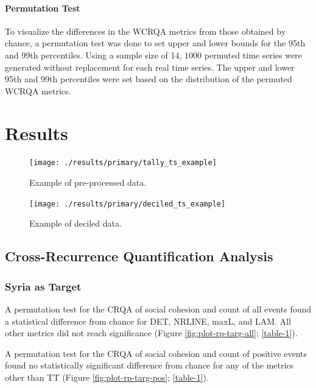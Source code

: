 \documentclass[
  english,
  man]{apa6}
\let\oldparagraph\paragraph
\renewcommand{\paragraph}[1]{\oldparagraph{#1}\mbox{}}
\begin{document}
\hypertarget{permutation-test-1}{%
\paragraph{Permutation Test}\label{permutation-test-1}}

To visualize the differences in the WCRQA metrics from those obtained by chance,
a permutation test was done to set upper and lower bounds for the 95th and 99th
percentiles. Using a sample size of 14, \(1000\) permuted time series were
generated without replacement for each real time series. The upper and lower
95th and 99th percentiles were set based on the distribution of the permuted
WCRQA metrics.

\hypertarget{results}{%
\section{Results}\label{results}}

\begin{figure}
\texttt{[image: ./results/primary/tally\_ts\_example]} \caption{Example of pre-processed data.}\label{fig:raw-ts}
\end{figure}

\begin{figure}
\texttt{[image: ./results/primary/deciled\_ts\_example]} \caption{Example of deciled data.}\label{fig:deciled-ts}
\end{figure}

\hypertarget{cross-recurrence-quantification-analysis-1}{%
\subsection{Cross-Recurrence Quantification Analysis}\label{cross-recurrence-quantification-analysis-1}}

\hypertarget{syria-as-target}{%
\subsubsection{Syria as Target}\label{syria-as-target}}

A permutation test for the CRQA of social cohesion and count of all events found
a statistical difference from chance for DET, NRLINE, maxL, and LAM. All other
metrics did not reach significance (Figure \ref{fig:plot-rp-targ-all};
\autoref{table-1}).

A permutation test for the CRQA of social cohesion and count of positive events
found no statistically significant difference from chance for any of the metrics
other than TT (Figure \ref{fig:plot-rp-targ-pos}; \autoref{table-1}).
\end{document}
